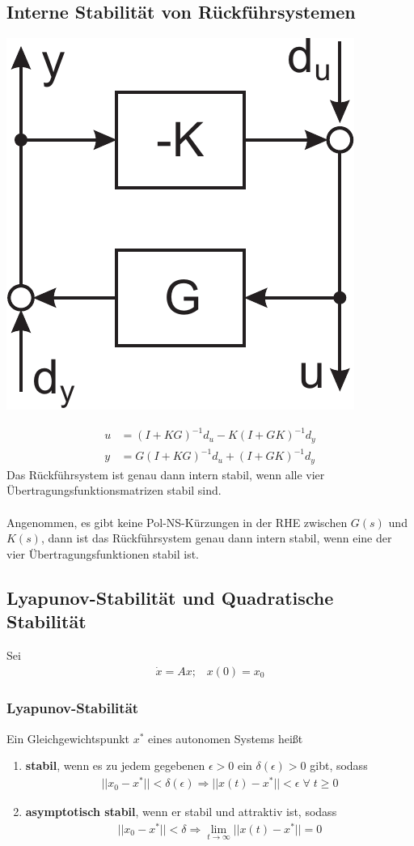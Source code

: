 \documentclass[a4paper,twocolumn,10pt]{article}
\begin{document}
\subsection{Interne Stabilität von Rückführsystemen}
\begin{center}
\includegraphics[width=0.5\columnwidth]{Grafiken/Rueckfuehrsystem_Stab}
\end{center}
\begin{align*}
u&=(I+KG)^{-1}d_u-K(I+GK)^{-1}d_y\\
y&=G(I+KG)^{-1}d_u+(I+GK)^{-1}d_y
\end{align*}
Das Rückführsystem ist genau dann intern stabil, wenn alle vier Übertragungsfunktionsmatrizen stabil sind.\\\\
Angenommen, es gibt keine Pol-NS-Kürzungen in der RHE zwischen $G(s)$ und $K(s)$, dann ist das Rückführsystem genau dann intern stabil, wenn eine der vier Übertragungsfunktionen stabil ist.

\subsection{Lyapunov-Stabilität und Quadratische Stabilität}
Sei
\begin{align*}
\dot{x}=Ax;\;\;\;x(0)=x_0
\end{align*}

\subsubsection{Lyapunov-Stabilität}
Ein Gleichgewichtspunkt $x^*$ eines autonomen Systems heißt
\begin{enumerate}[label=$\bullet$]
\item \textbf{stabil}, wenn es zu jedem gegebenen $\epsilon>0$ ein $\delta(\epsilon)>0$ gibt, sodass
\begin{align*}
||x_0-x^*||<\delta(\epsilon)\Rightarrow ||x(t)-x^*||<\epsilon\;\forall\;t\geq 0
\end{align*}
\item \textbf{asymptotisch stabil}, wenn er stabil und attraktiv ist, sodass
\begin{align*}
||x_0-x^*||<\delta\Rightarrow \lim\limits_{t\rightarrow\infty}||x(t)-x^*||=0
\end{align*}
\end{enumerate}
\end{document}
